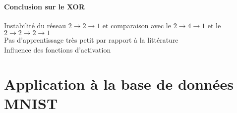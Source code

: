 
\paragraph{Conclusion sur le XOR} %
\label{par:conclusion_sur_le_xor}
Instabilité du réseau $2\rightarrow2\rightarrow1$ et comparaison avec le $ 2 \rightarrow 4 \rightarrow 1 $ et le $2 \rightarrow 2 \rightarrow 2 \rightarrow 1 $ \\
Pas d'apprentissage très petit par rapport à la littérature\\
Influence des fonctions d'activation

\section{Application à la base de données MNIST}


